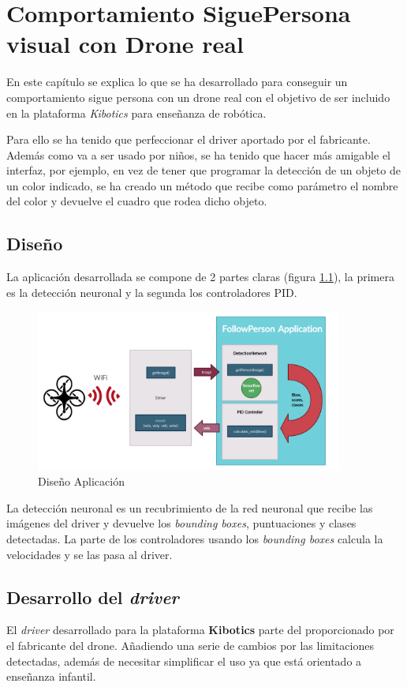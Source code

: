 \chapter{Comportamiento SiguePersona visual con Drone real}\label{cap.real}
En este capítulo se explica lo que se ha desarrollado para conseguir un comportamiento sigue persona con un drone real con el objetivo de ser incluido en la plataforma \textit{Kibotics} para enseñanza de robótica.

Para ello se ha tenido que perfeccionar el driver aportado por el fabricante\cite{tellodriver}. Además como va a ser usado por niños, se ha tenido que hacer más amigable el interfaz, por ejemplo, en vez de tener que programar la detección de un objeto de un color indicado, se ha creado un método que recibe como parámetro el nombre del color y devuelve el cuadro que rodea dicho objeto.

\section{Diseño}
La aplicación desarrollada se compone de 2 partes claras (figura \ref{fig:esquemaReal}), la primera es la detección neuronal y la segunda los controladores PID.
\begin{figure}[H]
  \begin{center}
    \includegraphics[width=0.9\textwidth]{figures/real/esquema2.png}
		\caption{Diseño Aplicación}
		\label{fig:esquemaReal}
		\end{center}
\end{figure}

La detección neuronal es un recubrimiento de la red neuronal que recibe las imágenes del driver y devuelve los \textit{bounding boxes}, puntuaciones y clases detectadas. 
La parte de los controladores usando los \textit{bounding boxes} calcula la velocidades y se las pasa al driver.
\section{Desarrollo del \textit{driver}}
El \textit{driver} desarrollado para la plataforma \textbf{Kibotics} parte del proporcionado por el fabricante del drone. Añadiendo una serie de cambios por las limitaciones detectadas, además de necesitar simplificar el uso ya que está orientado a enseñanza infantil. 

